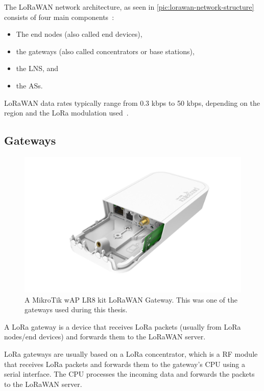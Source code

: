 The \ac{LoRaWAN} network architecture, as seen in \cref{pic:lorawan-network-structure} consists of four main components~\cite[p. 8]{lora_alliance_inc_lorawan_2017}:

\begin{itemize}
    \item The end nodes (also called end devices),
    \item the gateways (also called concentrators or base stations),
    \item the \acf{LNS}, and
    \item the \acfp{AS}.
\end{itemize}

\ac{LoRaWAN} data rates typically range from 0.3 kbps to 50 kbps, depending on the region and the \ac{LoRa} modulation used~\cite[p. 8]{lora_alliance_inc_lorawan_2017}.

\subsection{Gateways}

\begin{figure}[htbp]
    \centering
    \includegraphics[width=.6\textwidth]{pictures/hardware/gateways/mikrotik-lr8-kit.png}
    \caption{
        A MikroTik wAP LR8 kit \ac{LoRaWAN} Gateway.
        This was one of the gateways used during this thesis.~\protect\cite{the_things_industries_bv_lorawan_nodate}
    }\label{pic:mikrotik-lr8-kit-gateway}
\end{figure}

A \ac{LoRa} gateway is a device that receives \ac{LoRa} packets (usually from \ac{LoRa} nodes/end devices) and forwards them to the \ac{LoRaWAN} server.

\ac{LoRa} gateways are usually based on a \ac{LoRa} concentrator, which is a \ac{RF} module that receives \ac{LoRa} packets and forwards them to the gateway's \ac{CPU} using a serial interface.
The \ac{CPU} processes the incoming data and forwards the packets to the \ac{LoRaWAN} server.

